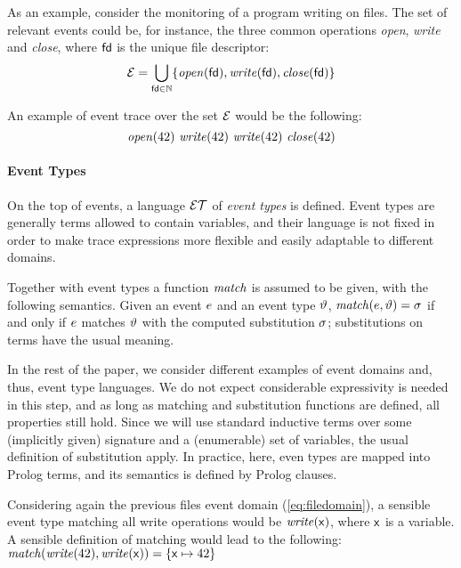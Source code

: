 As an example, consider the monitoring of a program writing on files.
The set of relevant events could be, for instance, the three common operations \emph{open}, \emph{write} and \emph{close}, where \(\mathsf{fd}\) is the unique file descriptor:
\begin{equation}\label{eq:filedomain}
\mathcal{E} = \bigcup_{\mathsf{fd} \in \mathbb{N}} \{\mathit{open}(\mathsf{fd}), \mathit{write}(\mathsf{fd}), \mathit{close}(\mathsf{fd})\}
\end{equation}

An example of event trace over the set \(\mathcal{E}\) would be the following:
\begin{equation} \label{eq:trace}
	\mathit{open}(42)\ \mathit{write}(42)\ \mathit{write}(42)\ \mathit{close}(42)
\end{equation}

\paragraph{Event Types}
On the top of events, a language \(\mathcal{ET}\) of \emph{event types} is defined.
Event types are generally terms allowed to contain variables, and their language is not fixed in order to make trace expressions more flexible and easily adaptable to different domains.

Together with event types a function \(\mathit{match}\) is assumed to be given, with the following semantics.
Given an event \(e\) and an event type \(\vartheta\), \(\mathit{match}(e, \vartheta) = \sigma\) if and only if \(e\) matches \(\vartheta\) with the computed substitution \(\sigma\); substitutions on terms have the usual meaning.

In the rest of the paper, we consider different examples of event domains and, thus, event type languages.
We do not expect considerable expressivity is needed in this step, and as long as matching and substitution functions are defined, all properties still hold.
Since we will use standard inductive terms over some (implicitly given) signature and a (enumerable) set of variables, the usual definition of substitution apply. In practice, here, even types are mapped into Prolog terms, and its semantics is defined by Prolog clauses. 

Considering again the previous files event domain (\ref{eq:filedomain}), a sensible event type matching all write operations would be \(\mathit{write}(\mathsf{x})\), where \(\mathsf{x}\) is a variable.
A sensible definition of matching would lead to the following: $\mathit{match}(\mathit{write}(42), \mathit{write}(\mathsf{x})) = \{ \mathsf{x} \mapsto 42 \}$

